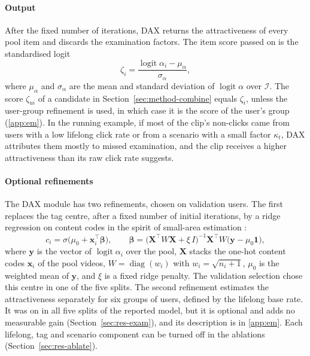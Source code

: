 \paragraph{Output} After the fixed number of iterations, DAX returns the attractiveness of every pool item and discards the examination
factors. The item score passed on is the standardised logit
\begin{equation}
  \zeta_i=\frac{\operatorname{logit}\alpha_i-\mu_\alpha}{\sigma_\alpha},
  \label{eq:zeta}
\end{equation}
where $\mu_\alpha$ and $\sigma_\alpha$ are the mean and standard deviation of $\operatorname{logit}\alpha$ over $\mathcal I$. The score
$\zeta_{ui}$ of a candidate in Section~\ref{sec:method-combine} equals $\zeta_i$, unless the user-group refinement is used, in which case
it is the score of the user's group (\ref{app:em}). In the running
example, if most of the clip's non-clicks came from users with a low lifelong click rate or from a scenario with a small factor $\kappa_t$, DAX
attributes them mostly to missed examination, and the clip receives a higher attractiveness than its raw click rate suggests.

\paragraph{Optional refinements} The DAX module has two refinements, chosen on validation users. The first replaces the tag centre, after a fixed number of initial iterations, by a ridge regression on content codes in the spirit of small-area estimation \citep{fay1979smallarea}:
\begin{equation}
  c_i=\sigma\bigl(\mu_0+\mathbf x_i^{\top}\boldsymbol\beta\bigr),\qquad
  \boldsymbol\beta=\bigl(\mathbf X^{\top}W\mathbf X+\xi\,I\bigr)^{-1}\mathbf X^{\top}W\bigl(\mathbf y-\mu_0\mathbf 1\bigr),
  \label{eq:content-centre}
\end{equation}
where $\mathbf y$ is the vector of $\operatorname{logit}\alpha_i$ over the pool, $\mathbf X$ stacks the one-hot content codes $\mathbf x_i$ of the
pool videos, $W=\operatorname{diag}(w_i)$ with $w_i=\sqrt{n_i+1}$, $\mu_0$ is the weighted mean of $\mathbf y$, and $\xi$ is a fixed ridge penalty. The validation selection chose this centre in one of the
five splits.
The second refinement estimates the attractiveness separately for six groups of users, defined by the lifelong base rate. It was on in
all five splits of the reported model, but it is optional and adds no measurable gain (Section~\ref{sec:res-exam}),
and its description is in \ref{app:em}. Each lifelong, tag and scenario component can be turned off in the ablations
(Section~\ref{sec:res-ablate}).

